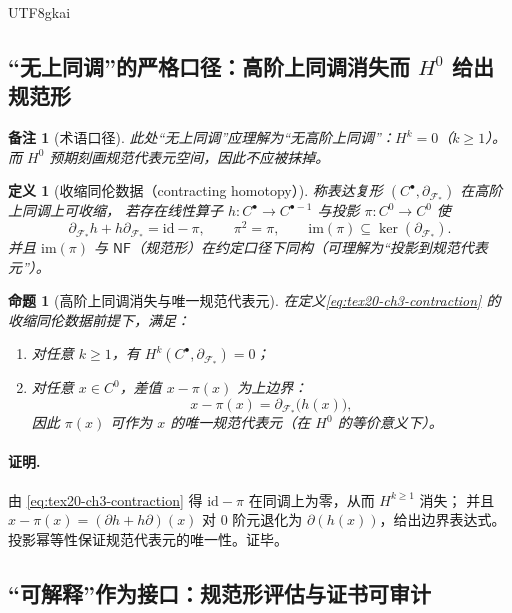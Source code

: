 \documentclass[12pt]{article}
\newtheorem{definition}{定义}[section]
\newtheorem{proposition}{命题}[section]
\newtheorem{remark}{备注}[section]
\begin{document}
\begin{CJK*}{UTF8}{gkai}
\subsection{“无上同调”的严格口径：高阶上同调消失而 $H^0$ 给出规范形}
\label{subsec:tex20-ch3-no-cohomology}

\begin{remark}[术语口径]
此处“无上同调”应理解为“无高阶上同调”：$H^k=0$（$k\ge 1$）。
而 $H^0$ 预期刻画规范代表元空间，因此不应被抹掉。
\end{remark}

\begin{definition}[收缩同伦数据（contracting homotopy）]
称表达复形 $(C^\bullet,\partial_{\mathcal{F}_\ast})$ 在高阶上同调上可收缩，
若存在线性算子 $h:C^\bullet\to C^{\bullet-1}$ 与投影 $\pi:C^0\to C^0$ 使
\[
\partial_{\mathcal{F}_\ast}h+h\partial_{\mathcal{F}_\ast}=\mathrm{id}-\pi,
\qquad
\pi^2=\pi,
\qquad
\mathrm{im}(\pi)\subseteq \ker(\partial_{\mathcal{F}_\ast}).
\tag{E3.1}
\label{eq:tex20-ch3-contraction}
\]
并且 $\mathrm{im}(\pi)$ 与 $\mathsf{NF}$（规范形）在约定口径下同构（可理解为“投影到规范代表元”）。
\end{definition}

\begin{proposition}[高阶上同调消失与唯一规范代表元]
\label{prop:tex20-ch3-acyclic}
在定义\ref{eq:tex20-ch3-contraction} 的收缩同伦数据前提下，满足：
\begin{enumerate}
  \item 对任意 $k\ge 1$，有 $H^k(C^\bullet,\partial_{\mathcal{F}_\ast})=0$；
  \item 对任意 $x\in C^0$，差值 $x-\pi(x)$ 为上边界：
  \[
  x-\pi(x)=\partial_{\mathcal{F}_\ast}\bigl(h(x)\bigr),
  \]
  因此 $\pi(x)$ 可作为 $x$ 的唯一规范代表元（在 $H^0$ 的等价意义下）。
\end{enumerate}
\end{proposition}

\paragraph{证明.}
由 \eqref{eq:tex20-ch3-contraction} 得 $\mathrm{id}-\pi$ 在同调上为零，从而 $H^{k\ge 1}$ 消失；
并且 $x-\pi(x)=(\partial h+h\partial)(x)$ 对 $0$ 阶元退化为 $\partial(h(x))$，给出边界表达式。
投影幂等性保证规范代表元的唯一性。证毕。

\subsection{“可解释”作为接口：规范形评估与证书可审计}
\label{subsec:tex20-ch3-interpretability}


\end{CJK*}
\end{document}
